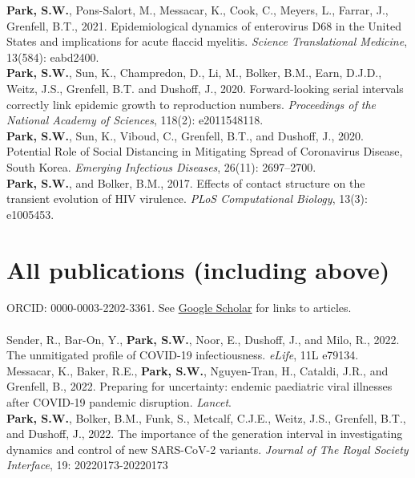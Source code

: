 \documentclass[11pt]{article} %
\begin{document}
 \textbf{Park, S.W.}, Pons-Salort, M., Messacar, K., Cook, C., Meyers, L., Farrar, J., Grenfell, B.T., 2021. Epidemiological dynamics of enterovirus D68 in the United States and implications for acute flaccid myelitis. \textit{Science Translational Medicine}, 13(584): eabd2400.\\

 \textbf{Park, S.W.}, Sun, K., Champredon, D., Li, M., Bolker, B.M., Earn, D.J.D., Weitz, J.S., Grenfell, B.T. and Dushoff, J., 2020. Forward-looking serial intervals correctly link epidemic growth to reproduction numbers. \textit{Proceedings of the National Academy of Sciences}, 118(2): e2011548118.\\

 \textbf{Park, S.W.}, Sun, K., Viboud, C., Grenfell, B.T., and Dushoff, J., 2020. Potential Role of Social Distancing in Mitigating Spread of Coronavirus Disease, South Korea. \textit{Emerging Infectious Diseases}, 26(11): 2697–2700.\\

 \textbf{Park, S.W.}, and Bolker, B.M., 2017. Effects of contact structure on the transient
evolution of HIV virulence. \textit{PLoS Computational Biology}, 13(3): e1005453.\\

\section*{All publications (including above)}

ORCID: 0000-0003-2202-3361. See \href{https://scholar.google.com/citations?user=ZSCrs78AAAAJ&hl=en&oi=ao}{Google Scholar} for links to articles.\\
\\

 Sender, R., Bar-On, Y., \textbf{Park, S.W.}, Noor, E., Dushoff, J., and Milo, R., 2022. The unmitigated profile of COVID-19 infectiousness. \textit{eLife}, 11L e79134.\\

 Messacar, K., Baker, R.E., \textbf{Park, S.W.}, Nguyen-Tran, H., Cataldi, J.R., and Grenfell, B., 2022. Preparing for uncertainty: endemic paediatric viral illnesses after COVID-19 pandemic disruption. \textit{Lancet}.\\

 \textbf{Park, S.W.}, Bolker, B.M., Funk, S., Metcalf, C.J.E., Weitz, J.S., Grenfell, B.T., and Dushoff, J., 2022. The importance of the generation interval in investigating dynamics and control of new SARS-CoV-2 variants. \textit{Journal of The Royal Society Interface}, 19: 20220173-20220173\\
\end{document}
